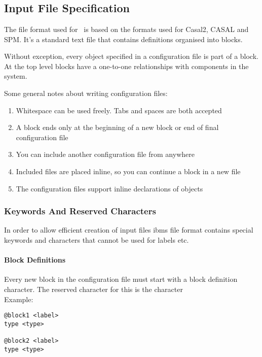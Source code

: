 
\section{\label{sec:examples}}
\subsection{Input File Specification}
The file format used for \IBM\ is based on the formats used for Casal2, CASAL and SPM. It's a standard text file that contains definitions organised into blocks.

Without exception, every object specified in a configuration file is part of a block. At the top level blocks have a one-to-one relationships with components in the system.


Some general notes about writing configuration files:
\begin{enumerate}
	\item Whitespace can be used freely. Tabs and spaces are both accepted
	\item A block ends only at the beginning of a new block or end of final configuration file
	\item You can include another configuration file from anywhere
	\item Included files are placed inline, so you can continue a block in a new file
	\item The configuration files support inline declarations of objects
\end{enumerate}

\subsubsection{Keywords And Reserved Characters}
In order to allow efficient creation of input files ibms file format contains special keywords and characters that cannot be used for labels etc.

\paragraph*{\command Block Definitions}
Every new block in the configuration file must start with a block definition character. The reserved character for this is the \command character\\
Example:
{\small{\begin{verbatim}
@block1 <label>
type <type>

@block2 <label>
type <type>
\end{verbatim}}}

